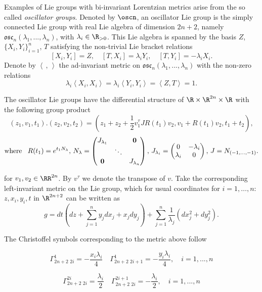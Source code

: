 \documentclass[12pt]{amsart}
\newcommand{\lela}{\left \langle}
\newcommand{\rira}{\right \rangle}
\theoremstyle{plain}
\theoremstyle{definition}
\theoremstyle{remark}
\begin{document}
	Examples of Lie groups with bi-invariant Lorentzian metrics arise from the so called  \textit{oscillator groups}. Denoted by $\oscn$, an oscillator Lie group is the simply connected Lie group with real Lie algebra of dimension $2n+2$, namely $\mathfrak{osc}_n(\lambda_1,...,\lambda_n)$, with $\lambda_i\in \R_{>0}$. This Lie algebra is  spanned by the basis $Z$,$\{X_i,Y_i\}_{i=1}^n$, $T$ satisfying the non-trivial Lie bracket relations
	\[ [X_i,Y_i]=Z, \quad [T, X_i]=\lambda_i Y_i, \quad  [T, Y_i]=- \lambda_i X_i.  \]
Denote by $\lela\,,\, \rira$  the ad-invariant  metric on $\mathfrak{osc}_n(\lambda_1,...,\lambda_n)$ with  the non-zero relations
	\[ \lambda_i \lela X_i,X_i \rira  = \lambda_i \lela Y_i,Y_i \rira = \lela Z,T  \rira  = 1.\]
	
	The oscillator Lie groups   have the differential structure of $\R \times \R^{2n} \times \R$ with the following group product
	\begin{equation*}
		(z_1,v_1,t_1) . (z_2,v_2,t_2)=(z_1+z_2+\frac{1}{2}v_1^{\tau}J R(t_1)v_2,v_1+R(t_1)v_2,t_1+t_2),
	\end{equation*}
	\[\text{where \,  } 
	R(t_1)= e^{t_1 N_{\lambda}}, \, N_\lambda=\left( \begin{matrix}
		J_{\lambda_1} &  & \mathbf{0} \\
		& \ddots & \\
		\mathbf{0} & & J_{\lambda_n}
	\end{matrix} \right),\, 
	J_{\lambda_i}=\left( \begin{matrix}
		0 & -\lambda_i \\
		\lambda_i & 0
	\end{matrix} \right), \, J = N_{(-1, \hdots, -1)}.
	\]
	
	for $v_1, v_2\in \RR^{2n}$. By $v^{\tau}$ we denote the transpose of $v$. 
	Take the corresponding left-invariant metric on the Lie group, which for usual  coordinates for $i=1, \hdots, n$: $z, x_i,y_i, t$ in $\R^{2n+2}$  can be written as
	\begin{equation}\label{metricosc}
		g=dt (dz +\sum_{j=1}^{n} y_j dx_j+ x_j dy_j) +\sum_{j=1}^{n}\frac1{\lambda_j}(dx_j^2+dy_j^2).
	\end{equation}
	
	The Christoffel symbols corresponding to the metric above follow
	
	\[ \Gamma^1_{2n+2 \,\, 2i}=-\frac{x_{i} \lambda_{i}}{4} \quad \Gamma^1_{2n+2 \,\, 2i+1}=-\frac{y_{i} \lambda_{i}}{4}, \quad i=1,..., n \]
	
	\[ \Gamma^{2i}_{2n+2 \,\, 2i}=\frac{\lambda_i}{2} \quad \Gamma^{2i+1}_{2n+2 \,\, 2i}=-\frac{\lambda_i}{2}, \quad i=1,..., n \]
	
\end{document}
